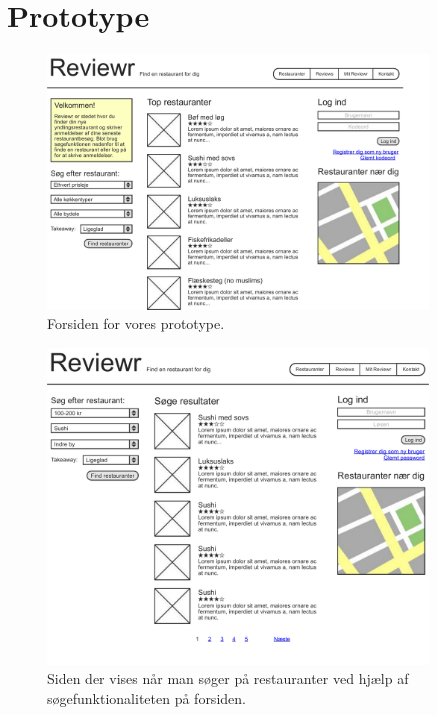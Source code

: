 \documentclass[a4paper, 12pt]{article}
\begin{document}
\section{Prototype}

\begin{figure}[hp]
  \centering
  \includegraphics[width=0.9\textwidth]{mockup/page1.pdf}
  \caption{Forsiden for vores prototype.}
\end{figure}

\begin{figure}[hp]
  \centering
  \includegraphics[width=0.9\textwidth]{mockup/page2.pdf}
  \caption{Siden der vises når man søger på restauranter ved hjælp af
    søgefunktionaliteten på forsiden.}
\end{figure}
\end{document}
